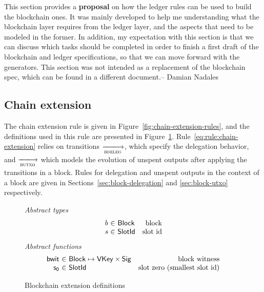 \begin{note}
  This section provides a \textbf{proposal} on how the ledger rules can be used
  to build the blockchain ones. It was mainly developed to help me
  understanding what the blockchain layer requires from the ledger layer, and
  the aspects that need to be modeled in the former. In addition, my
  expectation with this section is that we can discuss which tasks should be
  completed in order to finish a first draft of the blockchain and ledger
  specifications, so that we can move forward with the generators. This section
  was not intended as a replacement of the blockchain spec, which can be found
  in a different document.-- Damian Nadales
\end{note}

\subsection{Chain extension}
\label{sec:chain-extension}

The chain extension rule is given in Figure~\ref{fig:chain-extension-rules},
and the definitions used in this rule are presented in
Figure~\ref{fig:chain-extension-defs}. Rule~\ref{eq:rule:chain-extension}
relies on transitions $\trans{bdeleg}{}$, which specify the delegation
behavior, and $\trans{butxo}{}$ which models the evolution of unspent outputs
after applying the transitions in a block. Rules for delegation and unspent
outputs in the context of a block are given in
Sections~\ref{sec:block-delegation} and \ref{sec:block-utxo} respectively.

\begin{figure}
  \emph{Abstract types}
  \begin{equation*}
    \begin{array}{r@{~\in~}lr}
      \var{b} & \Block & \text{block}\\
      \var{s} & \SlotId & \text{slot id}\\
    \end{array}
  \end{equation*}
  \emph{Abstract functions}
  \begin{equation*}
    \begin{array}{r@{~\in~}lr}
    \fun{bwit} & \Block \mapsto \VKey \times \Sig & \text{block witness}\\
    \fun{s_0} & \SlotId  & \text{slot zero (smallest slot id)}\\
    \end{array}
  \end{equation*}
  \caption{Blockchain extension definitions}
  \label{fig:chain-extension-defs}
\end{figure}

